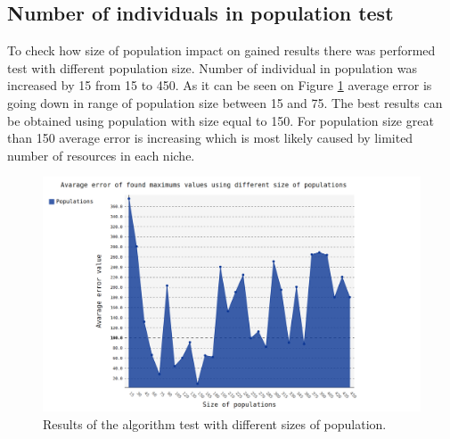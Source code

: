 \documentclass[a4paper]{article}
\begin{document}
\subsection{Number of individuals in population test}
To check how size of population impact on gained results there was performed test with different population size. Number of individual in population was 
increased by 15 from 15 to 450. As it can be seen on Figure \ref{populations} average error is going down in range of population size between 15 and 75. The best results 
can be obtained using population with size equal to 150. For population size great than 150 average error is increasing which is most likely caused by limited number of resources in each niche.
\vfill
\begin{figure}[ht]
	\centering
	\includegraphics[scale=0.36,keepaspectratio=true]{population.png}	
	\caption{Results of the algorithm test with different sizes of population.}
	\label{populations}
\end{figure}
\vfill
\clearpage
\end{document}
